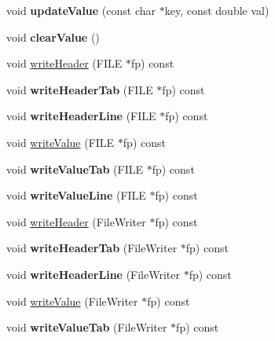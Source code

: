 \begin{DoxyCompactItemize}
\item 
\hypertarget{classResult_a2206ecba5c14edaf1d63a4074cd2e8f5}{void {\bfseries update\-Value} (const char $\ast$key, const double val)}\label{classResult_a2206ecba5c14edaf1d63a4074cd2e8f5}

\item 
\hypertarget{classResult_a153c42696b148e9ad7ebd201925946b3}{void {\bfseries clear\-Value} ()}\label{classResult_a153c42696b148e9ad7ebd201925946b3}

\item 
void \hyperlink{classResult_a92602a917ef47a87fdc16762d0017f3c}{write\-Header} (F\-I\-L\-E $\ast$fp) const 
\item 
\hypertarget{classResult_a212d4d6000439de7a1cec04e9b110f01}{void {\bfseries write\-Header\-Tab} (F\-I\-L\-E $\ast$fp) const }\label{classResult_a212d4d6000439de7a1cec04e9b110f01}

\item 
\hypertarget{classResult_ada699a3e8df0b0f64893ae1c25d3396c}{void {\bfseries write\-Header\-Line} (F\-I\-L\-E $\ast$fp) const }\label{classResult_ada699a3e8df0b0f64893ae1c25d3396c}

\item 
void \hyperlink{classResult_a6d61b480bc41160b47965e60c15252d4}{write\-Value} (F\-I\-L\-E $\ast$fp) const 
\item 
\hypertarget{classResult_a87a2a874ad657ed3dd539ac7e2b03cf7}{void {\bfseries write\-Value\-Tab} (F\-I\-L\-E $\ast$fp) const }\label{classResult_a87a2a874ad657ed3dd539ac7e2b03cf7}

\item 
\hypertarget{classResult_a69d2a73528e2c8f7c00f99ac6de63eb1}{void {\bfseries write\-Value\-Line} (F\-I\-L\-E $\ast$fp) const }\label{classResult_a69d2a73528e2c8f7c00f99ac6de63eb1}

\item 
void \hyperlink{classResult_ab8bf57bfefe1d12a45dbee6fc6d93401}{write\-Header} (File\-Writer $\ast$fp) const 
\item 
\hypertarget{classResult_ab6269f3e81b219782a17bb14e1873dd2}{void {\bfseries write\-Header\-Tab} (File\-Writer $\ast$fp) const }\label{classResult_ab6269f3e81b219782a17bb14e1873dd2}

\item 
\hypertarget{classResult_aa58493ead62143258d7ee80472dd8454}{void {\bfseries write\-Header\-Line} (File\-Writer $\ast$fp) const }\label{classResult_aa58493ead62143258d7ee80472dd8454}

\item 
void \hyperlink{classResult_a4edcccab48b157e081ac1a63090848ce}{write\-Value} (File\-Writer $\ast$fp) const 
\item 
\hypertarget{classResult_a19f1cfee0a96b6379c5d055f577563f2}{void {\bfseries write\-Value\-Tab} (File\-Writer $\ast$fp) const }\label{classResult_a19f1cfee0a96b6379c5d055f577563f2}


\end{DoxyCompactItemize}
